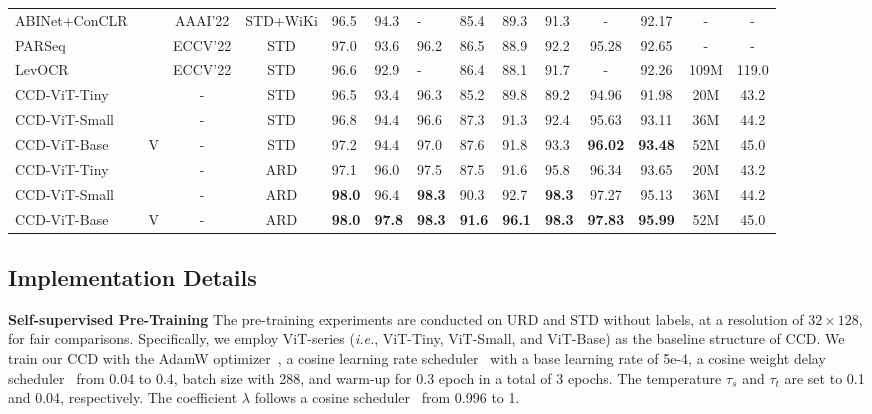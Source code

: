 \documentclass[10pt,twocolumn,letterpaper]{article}
\begin{document}
\begin{table*}[t]
{\begin{tabular}{l|c|c|c|p{7mm}<{\centering}p{7mm}<{\centering}p{7mm}<{\centering}p{7mm}<{\centering}p{7mm}<{\centering}p{7mm}<{\centering}|c|c|c|c}
  ABINet+ConCLR~\cite{ConCLR}  & &AAAI'22&STD+WiKi &96.5 &94.3 &- &85.4 &89.3 &91.3 &-&92.17&- &-\\
  PARSeq~\cite{bautista2022parseq} & &ECCV'22&STD &97.0 &93.6 &96.2 &86.5 &88.9 &92.2 &95.28&92.65&- &-\\
  LevOCR~\cite{LevOCR}  & &ECCV'22&STD &96.6 &92.9 &- &86.4 &88.1 &91.7 &-&92.26&109M &119.0\\
  \hline
  \rowcolor{mygray}
  CCD-ViT-Tiny           & &- &STD &96.5  &93.4 &96.3 &85.2 &89.8 &89.2 &94.96&91.98&20M &43.2 \\
  \rowcolor{mygray}
  CCD-ViT-Small           & &- &STD &96.8  &94.4 &96.6 &87.3 &91.3 &92.4 &95.63&93.11&36M &44.2 \\
  \rowcolor{mygray}
  CCD-ViT-Base           &\multirow{-3}{*}{V} &- &STD &97.2  &94.4 &97.0 &87.6 &91.8 &93.3 &\textbf{96.02}&\textbf{93.48}&52M  &45.0\\
  \hline
  \rowcolor{mygray}
  CCD-ViT-Tiny           & &- &ARD &97.1  &96.0 &97.5 &87.5 &91.6 &95.8 &96.34&93.65&20M  &43.2\\ 
  \rowcolor{mygray}
  CCD-ViT-Small           & &- &ARD &\textbf{98.0} &96.4 &\textbf{98.3} &90.3 &92.7 &\textbf{98.3}  &97.27&95.13&36M  &44.2\\
  \rowcolor{mygray}
  CCD-ViT-Base           &\multirow{-3}{*}{V} &- &ARD &\textbf{98.0} &\textbf{97.8} &\textbf{98.3} &\textbf{91.6}  &\textbf{96.1} &\textbf{98.3} &\textbf{97.83}&\textbf{95.99}&52M  &45.0\\
  \bottomrule
\end{tabular}     }
\label{tb:results}
\vspace{-1.2em}
\end{table*}

\vspace{-1.2em}
\subsection{Implementation Details}
\noindent \textbf{Self-supervised Pre-Training}
 The pre-training experiments are conducted on URD and STD without labels, at a resolution of $32\times 128$, for fair comparisons. 
 Specifically, we employ ViT-series (\emph{i.e.},  ViT-Tiny,  ViT-Small, and ViT-Base) as the baseline structure of CCD. We train our CCD with the AdamW optimizer~\cite{AdamW}, a cosine learning rate scheduler~\cite{Cosine} with a base learning rate of 5e-4, a cosine weight delay scheduler~\cite{Cosine} from 0.04 to 0.4, batch size with 288, and warm-up for 0.3 epoch in a total of 3 epochs. The temperature $\tau_{s}$ and $\tau_{t}$ are set to 0.1 and 0.04, respectively. The coefficient $\lambda$ follows a cosine scheduler~\cite{Cosine} from 0.996 to 1.
\end{document}
